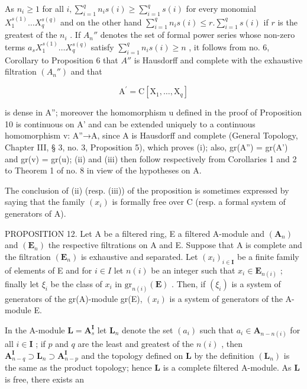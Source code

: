 As \(n_i \geqslant 1\) for all \(i, \sum_{i=1}^{q} n_i s(i) \geqslant \sum_{i=1}^{q} s(i)\) for every monomial \(X_1^{s(1)} \ldots X_q^{s(q)}\) and on the other hand \(\sum_{i=1}^{q} n_i s(i) \leqslant r. \sum_{i=1}^{q} s(i)\) if \(r\) is the greatest of the \(n_i\) . If \(A_n''\) denotes the set of formal power series whose non-zero terms \(a_s X_1^{s(1)} \ldots X_q^{s(q)}\) satisfy \(\sum_{i=1}^{q} n_i s(i) \geqslant n\) , it follows from no. 6, Corollary to Proposition 6 that \(A''\) is Hausdorff and complete with the exhaustive filtration \((A_n'')\) and that

\[
\mathrm{A} ^ {\prime} = \mathrm{C} [ \mathrm{X} _ {1}, \dots , \mathrm{X} _ {q} ]
\]

is dense in A''; moreover the homomorphism u defined in the proof of Proposition 10 is continuous on A' and can be extended uniquely to a continuous homomorphism v: A''→A, since A is Hausdorff and complete (General Topology, Chapter III, § 3, no. 3, Proposition 5), which proves (i); also, gr(A'') = gr(A') and gr(v) = gr(u); (ii) and (iii) then follow respectively from Corollaries 1 and 2 to Theorem 1 of no. 8 in view of the hypotheses on A.

The conclusion of (ii) (resp. (iii)) of the proposition is sometimes expressed by saying that the family \((x_{i})\) is formally free over C (resp. a formal system of generators of A).

PROPOSITION 12. Let A be a filtered ring, E a filtered A-module and \((\mathbf{A}_{n})\) and \((\mathbf{E}_{n})\) the respective filtrations on A and E. Suppose that A is complete and the filtration \((\mathbf{E}_{n})\) is exhaustive and separated. Let \((x_{i})_{i\in\mathbf{I}}\) be a finite family of elements of E and for \(i\in I\) let \(n(i)\) be an integer such that \(x_{i}\in\mathbf{E}_{n(i)}\) ; finally let \(\xi_{i}\) be the class of \(x_{i}\) in \(\mathrm{gr}_{n(i)}(\mathbf{E})\) . Then, if \((\xi_{i})\) is a system of generators of the gr(A)-module gr(E), \((x_{i})\) is a system of generators of the A-module E.

In the A-module \(\mathbf{L} = \mathbf{A}_s^{\mathbf{I}}\) let \(\mathbf{L}_n\) denote the set \((a_i)\) such that \(a_i \in \mathbf{A}_{n - n(i)}\) for all \(i \in \mathbf{I}\) ; if \(p\) and \(q\) are the least and greatest of the \(n(i)\) , then \(\mathbf{A}_{n - q}^{\mathbf{I}} \supset \mathbf{L}_n \supset \mathbf{A}_{n - p}^{\mathbf{I}}\) and the topology defined on \(\mathbf{L}\) by the definition \((\mathbf{L}_n)\) is the same as the product topology; hence \(\mathbf{L}\) is a complete filtered A-module. As \(\mathbf{L}\) is free, there exists an

